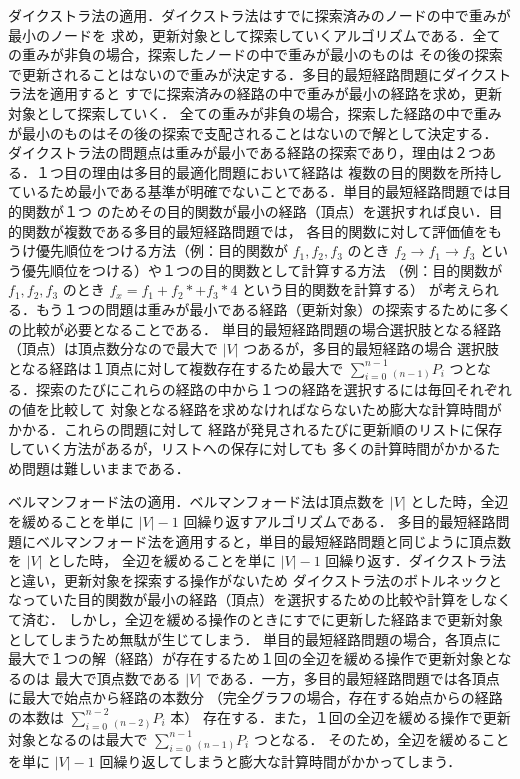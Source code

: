 \documentclass[12pt]{optlab-bachelor}
\begin{document}
ダイクストラ法の適用．ダイクストラ法はすでに探索済みのノードの中で重みが最小のノードを
求め，更新対象として探索していくアルゴリズムである．全ての重みが非負の場合，探索したノードの中で重みが最小のものは
その後の探索で更新されることはないので重みが決定する．多目的最短経路問題にダイクストラ法を適用すると
すでに探索済みの経路の中で重みが最小の経路を求め，更新対象として探索していく．
全ての重みが非負の場合，探索した経路の中で重みが最小のものはその後の探索で支配されることはないので解として決定する．
ダイクストラ法の問題点は重みが最小である経路の探索であり，理由は２つある．１つ目の理由は多目的最適化問題において経路は
複数の目的関数を所持しているため最小である基準が明確でないことである．単目的最短経路問題では目的関数が１つ
のためその目的関数が最小の経路（頂点）を選択すれば良い．目的関数が複数である多目的最短経路問題では，
各目的関数に対して評価値をもうけ優先順位をつける方法（例：目的関数が $f_1,f_2,f_3$ のとき
 $f_2 \rightarrow f_1 \rightarrow f_3 $ という優先順位をつける）や１つの目的関数として計算する方法
（例：目的関数が $f_1,f_2,f_3$ のとき $f_x = f_1 + f_2 * + f_3 * 4$ という目的関数を計算する）
が考えられる．もう１つの問題は重みが最小である経路（更新対象）の探索するために多くの比較が必要となることである．
単目的最短経路問題の場合選択肢となる経路（頂点）は頂点数分なので最大で $|V|$ つあるが，多目的最短経路の場合
選択肢となる経路は１頂点に対して複数存在するため最大で $\displaystyle \sum_{i=0}^{n-1} {}_{(n-1)}P_i$
つとなる．探索のたびにこれらの経路の中から１つの経路を選択するには毎回それぞれの値を比較して
対象となる経路を求めなければならないため膨大な計算時間がかかる．これらの問題に対して
経路が発見されるたびに更新順のリストに保存していく方法があるが，リストへの保存に対しても
多くの計算時間がかかるため問題は難しいままである．

ベルマンフォード法の適用．ベルマンフォード法は頂点数を $|V|$ とした時，全辺を緩めることを単に $|V|-1$ 回繰り返すアルゴリズムである．
多目的最短経路問題にベルマンフォード法を適用すると，単目的最短経路問題と同じように頂点数を $|V|$ とした時，
全辺を緩めることを単に $|V|-1$ 回繰り返す．ダイクストラ法と違い，更新対象を探索する操作がないため
ダイクストラ法のボトルネックとなっていた目的関数が最小の経路（頂点）を選択するための比較や計算をしなくて済む．
しかし，全辺を緩める操作のときにすでに更新した経路まで更新対象としてしまうため無駄が生じてしまう．
単目的最短経路問題の場合，各頂点に最大で１つの解（経路）が存在するため１回の全辺を緩める操作で更新対象となるのは
最大で頂点数である $|V|$ である．一方，多目的最短経路問題では各頂点に最大で始点から経路の本数分
（完全グラフの場合，存在する始点からの経路の本数は $\displaystyle \sum_{i=0}^{n-2} {}_{(n-2)}P_i$ 本）
存在する．また，１回の全辺を緩める操作で更新対象となるのは最大で $\displaystyle \sum_{i=0}^{n-1} {}_{(n-1)}P_i$ つとなる．
そのため，全辺を緩めることを単に $|V|-1$ 回繰り返してしまうと膨大な計算時間がかかってしまう．
\end{document}
